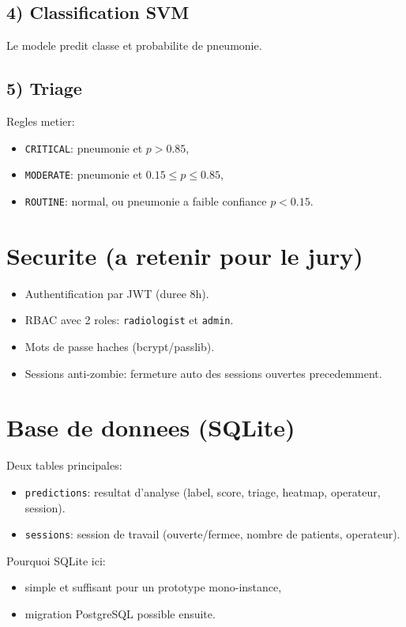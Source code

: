 \documentclass[12pt,a4paper]{article}
\begin{document}
\subsection{4) Classification SVM}
Le modele predit classe et probabilite de pneumonie.

\subsection{5) Triage}
Regles metier:
\begin{itemize}
  \item \texttt{CRITICAL}: pneumonie et $p > 0.85$,
  \item \texttt{MODERATE}: pneumonie et $0.15 \le p \le 0.85$,
  \item \texttt{ROUTINE}: normal, ou pneumonie a faible confiance $p < 0.15$.
\end{itemize}

\section{Securite (a retenir pour le jury)}
\begin{itemize}
  \item Authentification par JWT (duree 8h).
  \item RBAC avec 2 roles: \texttt{radiologist} et \texttt{admin}.
  \item Mots de passe haches (bcrypt/passlib).
  \item Sessions anti-zombie: fermeture auto des sessions ouvertes precedemment.
\end{itemize}

\section{Base de donnees (SQLite)}
Deux tables principales:
\begin{itemize}
  \item \texttt{predictions}: resultat d'analyse (label, score, triage, heatmap, operateur, session).
  \item \texttt{sessions}: session de travail (ouverte/fermee, nombre de patients, operateur).
\end{itemize}

Pourquoi SQLite ici:
\begin{itemize}
  \item simple et suffisant pour un prototype mono-instance,
  \item migration PostgreSQL possible ensuite.
\end{itemize}
\end{document}
